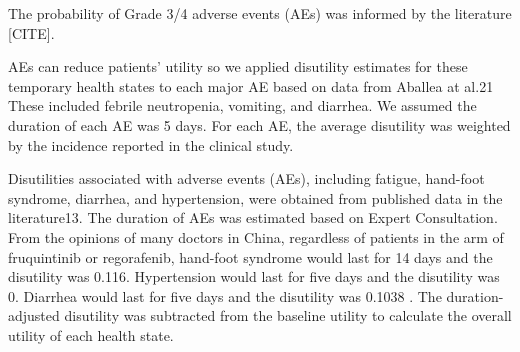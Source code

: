 \documentclass[
]{article}
\begin{document}
The probability of Grade 3/4 adverse events (AEs) was informed by the
literature {[}CITE{]}.

AEs can reduce patients' utility so we applied disutility estimates for
these temporary health states to each major AE based on data from
Aballea at al.21 These included febrile neutropenia, vomiting, and
diarrhea. We assumed the duration of each AE was 5 days. For each AE,
the average disutility was weighted by the incidence reported in the
clinical study.

Disutilities associated with adverse events (AEs), including fatigue,
hand-foot syndrome, diarrhea, and hypertension, were obtained from
published data in the literature13. The duration of AEs was estimated
based on Expert Consultation. From the opinions of many doctors in
China, regardless of patients in the arm of fruquintinib or regorafenib,
hand-foot syndrome would last for 14 days and the disutility was 0.116.
Hypertension would last for five days and the disutility was 0. Diarrhea
would last for five days and the disutility was 0.1038 . The
duration-adjusted disutility was subtracted from the baseline utility to
calculate the overall utility of each health state.
\end{document}
